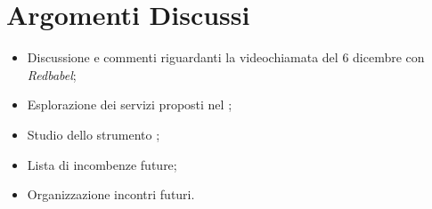 \section{Argomenti Discussi}
	\begin{itemize}
		\item Discussione e commenti riguardanti la videochiamata del 6 dicembre con \textit{Redbabel};
		\item Esplorazione dei servizi proposti nel ;
        \item Studio dello strumento ;
        \item Lista di incombenze future;
		\item Organizzazione incontri futuri.
	\end{itemize}
